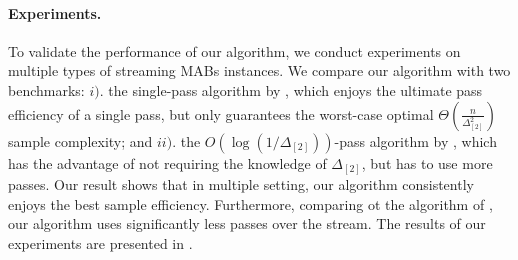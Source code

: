 
\paragraph{Experiments.} To validate the performance of our algorithm, we conduct experiments on multiple types of streaming MABs instances. We compare our algorithm with two benchmarks: $i).$ the single-pass algorithm by \cite{AssadiW20}, which enjoys the ultimate pass efficiency of a single pass, but only guarantees the worst-case optimal $\Theta(\frac{n}{\Delta^2_{[2]}})$ sample complexity; and $ii).$ the  $O(\log(1/\Delta_{[2]}))$-pass algorithm by \cite{JinH0X21}, which has the advantage of not requiring the knowledge of $\Delta_{[2]}$, but has to use more passes. Our result shows that in multiple setting, our algorithm consistently enjoys the best sample efficiency. Furthermore, comparing ot the algorithm of \cite{JinH0X21}, our algorithm uses significantly less passes over the stream. The results of our experiments are presented in .



